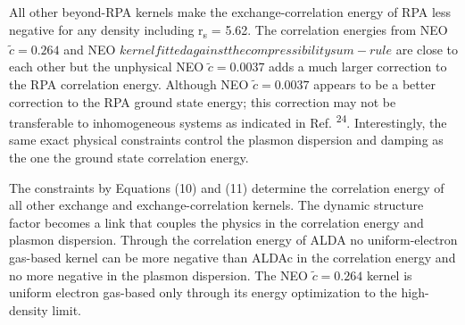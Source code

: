 \documentclass[12pt]{article}
\renewcommand{\_}{\kern-1.5pt\textunderscore\kern-1.5pt}
\begin{document}
\begin{justify}
All other beyond-RPA kernels make the exchange-correlation energy of RPA less negative for any density including r\textsubscript{s} = 5.62. The correlation energies from NEO  \( \widetilde{c}=0.264 \)  and NEO  \( kernel fitted against the compressibility sum-rule \)  are close to each other but the unphysical NEO  \( \widetilde{c}=0.0037 \)  adds a much larger correction to the RPA correlation energy. Although NEO  \( \widetilde{c}=0.0037 \)  appears to be a better correction to the RPA ground state energy; this correction may not be transferable to inhomogeneous systems as indicated in Ref. \textsuperscript{24}. Interestingly, the same exact physical constraints control the plasmon dispersion and damping as the one the ground state correlation energy.
\end{justify}\par

\begin{justify}
The constraints by Equations (10) and (11) determine the correlation energy of all other exchange and exchange-correlation kernels. The dynamic structure factor becomes a link that couples the physics in the correlation energy and plasmon dispersion. Through the correlation energy of ALDA no uniform-electron gas-based kernel can be more negative than ALDAc in the correlation energy and no more negative in the plasmon dispersion. The NEO  \( \widetilde{c}=0.264 \)  kernel is uniform electron gas-based only through its energy optimization to the high-density limit.
\end{justify}\par


\vspace{\baselineskip}
\setlength{\parskip}{9.96pt}

\vspace{\baselineskip}
\setlength{\parskip}{0.0pt}
\setlength{\parskip}{9.96pt}

\vspace{\baselineskip}
\setlength{\parskip}{0.0pt}
\setlength{\parskip}{9.96pt}


\end{document}

